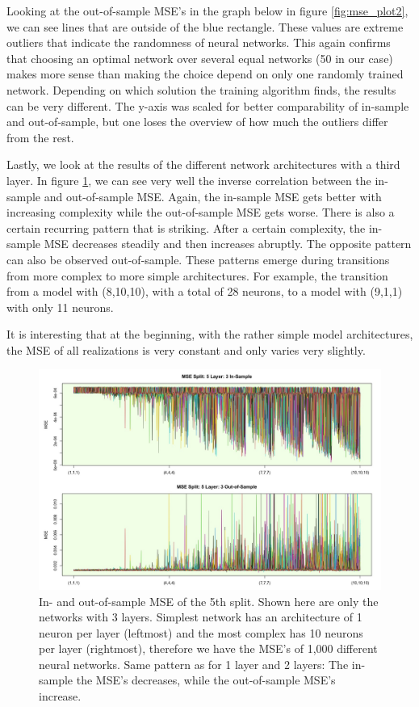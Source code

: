 \documentclass[
]{article}
\begin{document}
Looking at the out-of-sample MSE's in the graph below in figure
\ref{fig:mse_plot2}, we can see lines that are outside of the blue
rectangle. These values are extreme outliers that indicate the
randomness of neural networks. This again confirms that choosing an
optimal network over several equal networks (50 in our case) makes more
sense than making the choice depend on only one randomly trained
network. Depending on which solution the training algorithm finds, the
results can be very different. The y-axis was scaled for better
comparability of in-sample and out-of-sample, but one loses the overview
of how much the outliers differ from the rest.

\newpage

Lastly, we look at the results of the different network architectures
with a third layer. In figure \ref{fig:mse_plot3}, we can see very well
the inverse correlation between the in-sample and out-of-sample MSE.
Again, the in-sample MSE gets better with increasing complexity while
the out-of-sample MSE gets worse. There is also a certain recurring
pattern that is striking. After a certain complexity, the in-sample MSE
decreases steadily and then increases abruptly. The opposite pattern can
also be observed out-of-sample. These patterns emerge during transitions
from more complex to more simple architectures. For example, the
transition from a model with (8,10,10), with a total of 28 neurons, to a
model with (9,1,1) with only 11 neurons.

It is interesting that at the beginning, with the rather simple model
architectures, the MSE of all realizations is very constant and only
varies very slightly.

\begin{figure}

{\centering \includegraphics[width=1\linewidth]{images/batch5/mse_5_layer3} 

}

\caption{In- and out-of-sample MSE of the 5th split. Shown here are only the networks with 3 layers. Simplest network has an architecture of 1 neuron per layer (leftmost) and the most complex has 10 neurons per layer (rightmost), therefore we have the MSE's of 1,000 different neural networks. Same pattern as for 1 layer and 2 layers: The in-sample the MSE's decreases, while the out-of-sample MSE's increase.}\label{fig:mse_plot3}
\end{figure}
\newpage
\end{document}
